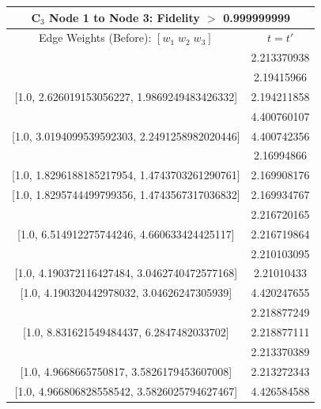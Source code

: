\documentclass[reprint, aps, 12pt, floatfix]{revtex4-2}
\begin{document}
\begin{center}
    \begin{tabular}{||c c||}
        \multicolumn{2}{c}{C$_3$ Node 1 to Node 3: Fidelity $>$ 0.999999999}\\
        \hline
        Edge Weights (Before): $[w_1 \; w_2 \; w_3]$&$t=t'$\\
        \hline
        [1.0, 4.966668010139432, 3.5824101220603324]&2.213370938\\
        \hline
        [1.0, 2.626107662589982, 1.9870253129406752]&2.19415966\\

        [1.0, 2.626019153056227, 1.9869249483426332]&2.194211858\\
        \hline
        [1.0, 3.019388275770154, 2.249123071255105]&4.400760107\\

        [1.0, 3.0194099539592303, 2.2491258982020446]&4.400742356\\
        \hline
        [1.0, 1.8296080121756138, 1.4743588551271927]&2.16994866\\

        [1.0, 1.8296188185217954, 1.4743703261290761]&2.169908176\\

        [1.0, 1.8295744499799356, 1.4743567317036832]&2.169934767\\
        \hline
        [1.0, 6.514908869965452, 4.660636426543189]&2.216720165\\

        [1.0, 6.514912275744246, 4.660633424425117]&2.216719864\\
        \hline
        [1.0, 4.190375519828131, 3.04627311787354]&2.210103095\\

        [1.0, 4.190372116427484, 3.0462740472577168]&2.21010433\\

        [1.0, 4.190320442978032, 3.04626247305939]&4.420247655\\
        \hline
        [1.0, 8.831622946956266, 6.284745496566233]&2.218877249\\

        [1.0, 8.831621549484437, 6.2847482033702]&2.218877111\\
        \hline
        [1.0, 4.9666694857153235, 3.582410192032633]&2.213370389\\

        [1.0, 4.9668665750817, 3.5826179453607008]&2.213272343\\

        [1.0, 4.966806828558542, 3.5826025794627467]&4.426584588\\
        \hline
    \end{tabular}
\end{center}
\end{document}
